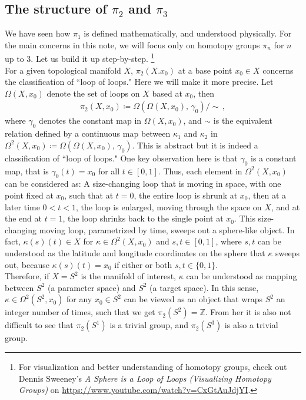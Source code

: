 \documentclass[11pt, onesided]{book}
\theoremstyle{break}
\theoremstyle{break}
\newcommand{\Z}{\mathbb{Z}}
\begin{document}
\subsection{The structure of $\pi_2$ and $\pi_3$}
We have seen how $\pi_1$ is defined mathematically, and understood physically. For the main concerns in this note, we will focus only on homotopy groups $\pi_n$ for $n$ up to $3$. Let us build it up step-by-step. \footnote{For visualization and better understanding of homotopy groups, check out Dennis Sweeney's \textit{A Sphere is a Loop of Loops (Visualizing Homotopy Groups)} on \url{https://www.youtube.com/watch?v=CxGtAuJdjYI}.}\\

For a given topological manifold $X$, $\pi_2(X.x_0)$ at a base point $x_0 \in X$ concerns the classification of ``loop of loops." Here we will make it more precise. Let $\Omega(X,x_0)$ denote the set of loops on $X$ based at $x_0$, then 
\begin{align*}
\pi_2(X,x_0) \coloneqq \Omega(\Omega(X,x_0), \, \gamma_0) / \sim\,,
\end{align*}
where $\gamma_0$ denotes the constant map in $\Omega(X,x_0)$, and $\sim$ is the equivalent relation defined by a continuous map between $\kappa_1$ and $\kappa_2$ in $\Omega^2(X,x_0) \coloneqq \Omega(\Omega(X,x_0), \, \gamma_0)$. This is abstract but it is indeed a classification of ``loop of loops." One key observation here is that $\gamma_0$ is a constant map, that is $\gamma_0(t) = x_0$ for all $t \in [0,1]$. Thus, each element in $\Omega^2(X,x_0)$ can be considered as: A size-changing loop that is moving in space, with one point fixed at $x_0$, such that at $t = 0$, the entire loop is shrunk at $x_0$, then at a later time $0<t <1$, the loop is enlarged, moving through the space on $X$, and at the end at $t = 1$, the loop shrinks back to the single point at $x_0$. This size-changing moving loop, parametrized by time, sweeps out a sphere-like object. In fact, $\kappa(s)(t) \in X$ for $\kappa \in \Omega^2(X,x_0)$ and $s,t \in [0,1]$, where $s,t$ can be understood as the latitude and longitude coordinates on the sphere that $\kappa$ sweeps out, because $\kappa(s)(t) = x_0$ if either or both $s,t\in\{0,1\}$. \\

Therefore, if $X = S^2$ is the manifold of interest, $\kappa$ can be understood as mapping between $S^2$ (a parameter space) and $S^2$ (a target space). In this sense, $\kappa \in \Omega^2(S^2,x_0)$ for any $x_0 \in S^2$ can be viewed as an object that wraps $S^2$ an integer number of times, such that we get $\pi_2(S^2) = \Z$. From her it is also not difficult to see that $\pi_2(S^1) $ is a trivial group, and $\pi_2(S^3)$ is also a trivial group. \\
\end{document}
